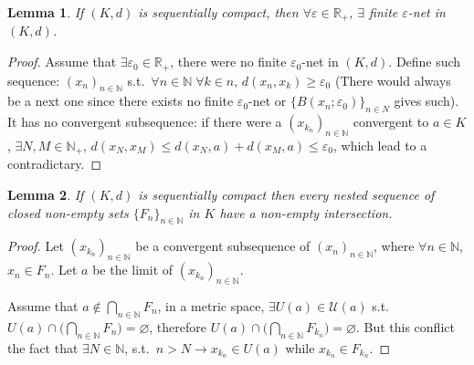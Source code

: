 \documentclass[openany]{book}
\theoremstyle{plain}
\newtheorem{lemma}{Lemma} %
\theoremstyle{definition}
\begin{document}
\begin{lemma}\label{lemma: finite e-net exists (metric, sequentially compact)}
	If $(K, d)$ is sequentially compact, then $\forall \varepsilon \in \mathbb R_+$, $\exists$ finite $\varepsilon$-net in $(K, d)$. 
\end{lemma}
\begin{proof}
	Assume that $\exists \varepsilon_0 \in \mathbb R_+$, there were no finite  $\varepsilon_0$-net in $(K, d)$. 
	Define such sequence: $ (x_n)_{n \in \mathbb N}$ s.t.\ $\forall n \in \mathbb N \; \forall k \in n$, $d(x_n, x_k) \geq \varepsilon_0$ 
		(There would always be a next one since there exists no finite $\varepsilon_0$-net or $\{B(x_n; \varepsilon_0)\}_{n \in N}$ gives such). 
		It has no convergent subsequence: 
		if there were a $(x_{k_n})_{n \in \mathbb N}$ convergent to $a\in K$, $\exists N,M\in\mathbb{N}_+$, $d(x_N, x_M)\leq d(x_N, a)+d(x_M, a)\leq \varepsilon_0$, which lead to a contradictary. 
\end{proof}

\begin{lemma}\label{lemma: intersection of closed nested sequence (sequentially compact)}
	If $(K, d)$ is sequentially compact then every nested sequence of closed non-empty sets $\{F_n\}_{n \in \mathbb N}$ in $K$ have a non-empty intersection.
\end{lemma}
\begin{proof}
	Let $(x_{k_n})_{n \in \mathbb N}$ be a convergent subsequence of $(x_n)_{n \in \mathbb N}$, where $\forall n \in \mathbb N$, $x_n \in F_n$. 
	Let $a$ be the limit of $(x_{k_n})_{n \in \mathbb N}$. 

	Assume that $a \notin \bigcap_{n \in \mathbb N} F_n$, in a metric space, $\exists U(a) \in \mathscr U(a)$ s.t.\ $U(a) \cap \big(\bigcap_{n \in \mathbb N} F_n \big) = \varnothing$, therefore $U(a) \cap \big(\bigcap_{n \in \mathbb N} F_{k_n} \big)=\varnothing$. 
	But this conflict the fact that $\exists N \in \mathbb N$, s.t.\ $n > N \to x_{k_n}\in U(a)$ while $x_{k_n} \in F_{k_n}$.
\end{proof}
\end{document}
